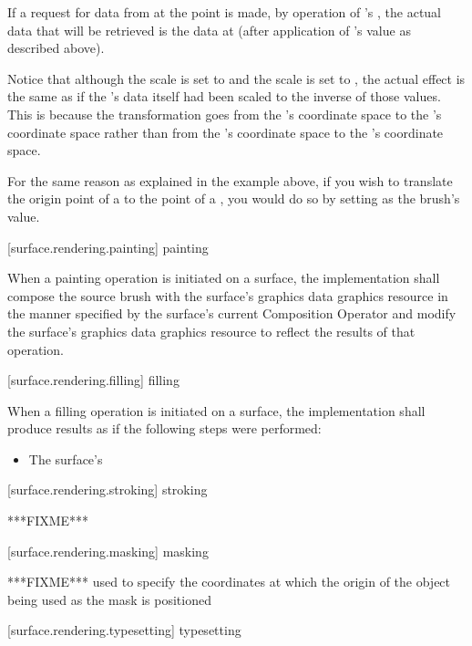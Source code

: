 \pnum
If a request for data from  at the point  is made, by operation of 's , the actual data that will be retrieved is the data at  (after application of 's  value as described above).

\pnum
Notice that although the \xaxis scale is set to  and the \yaxis scale is set to , the actual effect is the same as if the 's data itself had been scaled to the inverse of those values. This is because the transformation goes from the 's coordinate space to the 's coordinate space rather than from the 's coordinate space to the 's coordinate space.
\exitexample

\pnum
\enternote
For the same reason as explained in the example above, if you wish to translate the origin point of a  to the point  of a , you would do so by setting  as the brush's  value.
\exitnote

 [surface.rendering.painting] { painting}

\pnum
When a painting operation is initiated on a surface, the implementation shall compose the source brush with the surface's graphics data graphics resource in the manner specified by the surface's current Composition Operator and modify the surface's graphics data graphics resource to reflect the results of that operation.

 [surface.rendering.filling] { filling}

\pnum
When a filling operation is initiated on a surface, the implementation shall produce results as if the following steps were performed:
\begin{itemize}
	\item The surface's 
\end{itemize}

 [surface.rendering.stroking] { stroking}

\pnum
***FIXME***

 [surface.rendering.masking] { masking}

\pnum
***FIXME*** used to specify the coordinates at which the origin of the  object being used as the mask is positioned

 [surface.rendering.typesetting] { typesetting}

